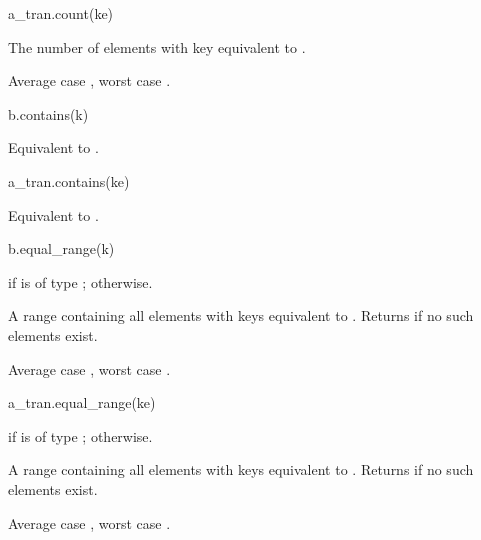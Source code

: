 %
\begin{itemdecl}
a_tran.count(ke)
\end{itemdecl}

\begin{itemdescr}
\pnum
\result
{}

\pnum
\returns
The number of elements with key equivalent to .

\pnum
\complexity
Average case ,
worst case .
\end{itemdescr}

%
\begin{itemdecl}
b.contains(k)
\end{itemdecl}

\begin{itemdescr}
\pnum
\effects
Equivalent to .
\end{itemdescr}

%
\begin{itemdecl}
a_tran.contains(ke)
\end{itemdecl}

\begin{itemdescr}
\pnum
\effects
Equivalent to .
\end{itemdescr}

%
\begin{itemdecl}
b.equal_range(k)
\end{itemdecl}

\begin{itemdescr}
\pnum
\result
{}
if  is of type ;
 otherwise.

\pnum
\returns
A range containing all elements with keys equivalent to .
Returns  if no such elements exist.

\pnum
\complexity
Average case , worst case .
\end{itemdescr}

%
\begin{itemdecl}
a_tran.equal_range(ke)
\end{itemdecl}

\begin{itemdescr}
\pnum
\result
{}
if  is of type ;
 otherwise.

\pnum
\returns
A range containing all elements with keys equivalent to .
Returns  if no such elements exist.

\pnum
\complexity
Average case ,
worst case .
\end{itemdescr}

